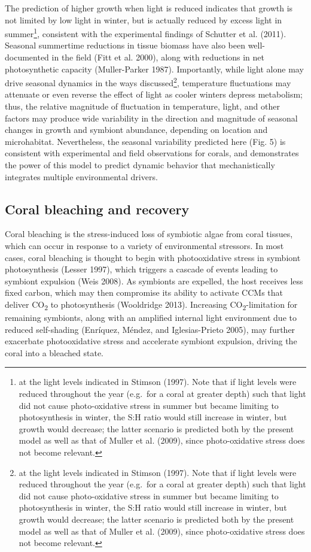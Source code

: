 \documentclass[]{elsarticle} %
\begin{document}
The prediction of higher growth when light is reduced indicates that
growth is not limited by low light in winter, but is actually reduced by
excess light in summer\footnote{at the light levels indicated in Stimson
  (1997). Note that if light levels were reduced throughout the year
  (e.g.~for a coral at greater depth) such that light did not cause
  photo-oxidative stress in summer but became limiting to photosynthesis
  in winter, the S:H ratio would still increase in winter, but growth
  would decrease; the latter scenario is predicted both by the present
  model as well as that of Muller et al. (2009), since photo-oxidative
  stress does not become relevant.}, consistent with the experimental
findings of Schutter et al. (2011). Seasonal summertime reductions in
tissue biomass have also been well-documented in the field (Fitt et al.
2000), along with reductions in net photosynthetic capacity
(Muller-Parker 1987). Importantly, while light alone may drive seasonal
dynamics in the ways discussed\footnote{at the light levels indicated in
  Stimson (1997). Note that if light levels were reduced throughout the
  year (e.g.~for a coral at greater depth) such that light did not cause
  photo-oxidative stress in summer but became limiting to photosynthesis
  in winter, the S:H ratio would still increase in winter, but growth
  would decrease; the latter scenario is predicted both by the present
  model as well as that of Muller et al. (2009), since photo-oxidative
  stress does not become relevant.}, temperature fluctuations may
attenuate or even reverse the effect of light as cooler winters depress
metabolism; thus, the relative magnitude of fluctuation in temperature,
light, and other factors may produce wide variability in the direction
and magnitude of seasonal changes in growth and symbiont abundance,
depending on location and microhabitat. Nevertheless, the seasonal
variability predicted here (Fig. 5) is consistent with experimental and
field observations for corals, and demonstrates the power of this model
to predict dynamic behavior that mechanistically integrates multiple
environmental drivers.

\subsection{Coral bleaching and
recovery}\label{coral-bleaching-and-recovery}

Coral bleaching is the stress-induced loss of symbiotic algae from coral
tissues, which can occur in response to a variety of environmental
stressors. In most cases, coral bleaching is thought to begin with
photooxidative stress in symbiont photosynthesis (Lesser 1997), which
triggers a cascade of events leading to symbiont expulsion (Weis 2008).
As symbionts are expelled, the host receives less fixed carbon, which
may then compromise its ability to activate CCMs that deliver
CO\textsubscript{2} to photosynthesis (Wooldridge 2013). Increasing
CO\textsubscript{2}-limitation for remaining symbionts, along with an
amplified internal light environment due to reduced self-shading
(Enríquez, Méndez, and Iglesias-Prieto 2005), may further exacerbate
photooxidative stress and accelerate symbiont expulsion, driving the
coral into a bleached state.
\end{document}
